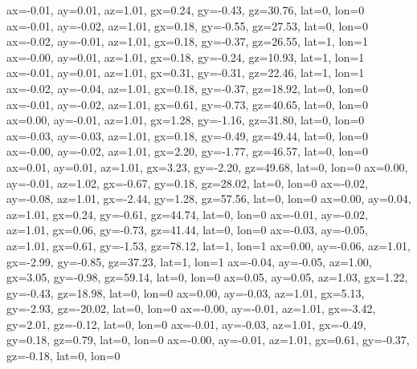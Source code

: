 ax=-0.01, ay=0.01, az=1.01, gx=0.24, gy=-0.43, gz=30.76, lat=0, lon=0
ax=-0.01, ay=-0.02, az=1.01, gx=0.18, gy=-0.55, gz=27.53, lat=0, lon=0
ax=-0.02, ay=-0.01, az=1.01, gx=0.18, gy=-0.37, gz=26.55, lat=1, lon=1
ax=-0.00, ay=0.01, az=1.01, gx=0.18, gy=-0.24, gz=10.93, lat=1, lon=1
ax=-0.01, ay=0.01, az=1.01, gx=0.31, gy=-0.31, gz=22.46, lat=1, lon=1
ax=-0.02, ay=-0.04, az=1.01, gx=0.18, gy=-0.37, gz=18.92, lat=0, lon=0
ax=-0.01, ay=-0.02, az=1.01, gx=0.61, gy=-0.73, gz=40.65, lat=0, lon=0
ax=0.00, ay=-0.01, az=1.01, gx=1.28, gy=-1.16, gz=31.80, lat=0, lon=0
ax=-0.03, ay=-0.03, az=1.01, gx=0.18, gy=-0.49, gz=49.44, lat=0, lon=0
ax=-0.00, ay=-0.02, az=1.01, gx=2.20, gy=-1.77, gz=46.57, lat=0, lon=0
ax=0.01, ay=0.01, az=1.01, gx=3.23, gy=-2.20, gz=49.68, lat=0, lon=0
ax=0.00, ay=-0.01, az=1.02, gx=-0.67, gy=0.18, gz=28.02, lat=0, lon=0
ax=-0.02, ay=-0.08, az=1.01, gx=-2.44, gy=1.28, gz=57.56, lat=0, lon=0
ax=0.00, ay=0.04, az=1.01, gx=0.24, gy=-0.61, gz=44.74, lat=0, lon=0
ax=-0.01, ay=-0.02, az=1.01, gx=0.06, gy=-0.73, gz=41.44, lat=0, lon=0
ax=-0.03, ay=-0.05, az=1.01, gx=0.61, gy=-1.53, gz=78.12, lat=1, lon=1
ax=0.00, ay=-0.06, az=1.01, gx=-2.99, gy=-0.85, gz=37.23, lat=1, lon=1
ax=-0.04, ay=-0.05, az=1.00, gx=3.05, gy=-0.98, gz=59.14, lat=0, lon=0
ax=0.05, ay=0.05, az=1.03, gx=1.22, gy=-0.43, gz=18.98, lat=0, lon=0
ax=0.00, ay=-0.03, az=1.01, gx=5.13, gy=-2.93, gz=-20.02, lat=0, lon=0
ax=-0.00, ay=-0.01, az=1.01, gx=-3.42, gy=2.01, gz=-0.12, lat=0, lon=0
ax=-0.01, ay=-0.03, az=1.01, gx=-0.49, gy=0.18, gz=0.79, lat=0, lon=0
ax=-0.00, ay=-0.01, az=1.01, gx=0.61, gy=-0.37, gz=-0.18, lat=0, lon=0
